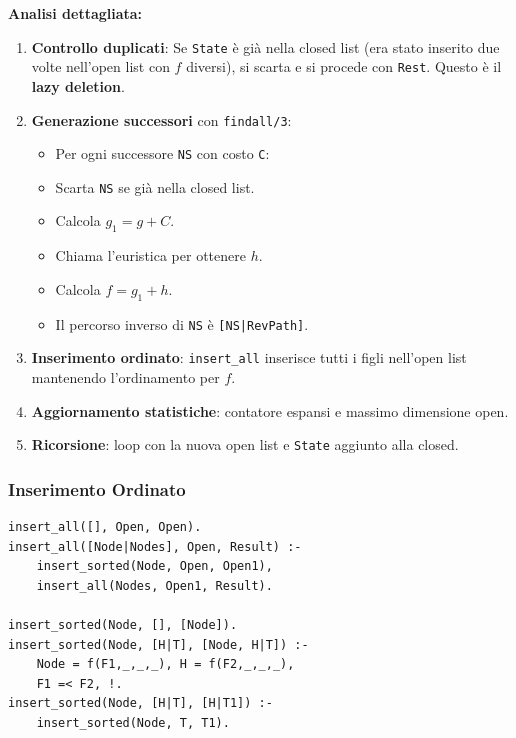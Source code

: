 \documentclass[12pt,a4paper]{article}
\begin{document}
\noindent\textbf{Analisi dettagliata:}

\begin{enumerate}
  \item \textbf{Controllo duplicati}: Se \texttt{State} è già nella closed list
        (era stato inserito due volte nell'open list con $f$ diversi), si scarta
        e si procede con \texttt{Rest}. Questo è il \textbf{lazy deletion}.

  \item \textbf{Generazione successori} con \texttt{findall/3}:
        \begin{itemize}[noitemsep]
          \item Per ogni successore \texttt{NS} con costo \texttt{C}:
          \item Scarta \texttt{NS} se già nella closed list.
          \item Calcola $g_1 = g + C$.
          \item Chiama l'euristica per ottenere $h$.
          \item Calcola $f = g_1 + h$.
          \item Il percorso inverso di \texttt{NS} è \texttt{[NS|RevPath]}.
        \end{itemize}

  \item \textbf{Inserimento ordinato}: \texttt{insert\_all} inserisce tutti i
        figli nell'open list mantenendo l'ordinamento per $f$.

  \item \textbf{Aggiornamento statistiche}: contatore espansi e massimo dimensione open.

  \item \textbf{Ricorsione}: loop con la nuova open list e \texttt{State} aggiunto alla closed.
\end{enumerate}

\subsubsection{Inserimento Ordinato}

\begin{lstlisting}
insert_all([], Open, Open).
insert_all([Node|Nodes], Open, Result) :-
    insert_sorted(Node, Open, Open1),
    insert_all(Nodes, Open1, Result).

insert_sorted(Node, [], [Node]).
insert_sorted(Node, [H|T], [Node, H|T]) :-
    Node = f(F1,_,_,_), H = f(F2,_,_,_),
    F1 =< F2, !.
insert_sorted(Node, [H|T], [H|T1]) :-
    insert_sorted(Node, T, T1).
\end{lstlisting}
\end{document}
